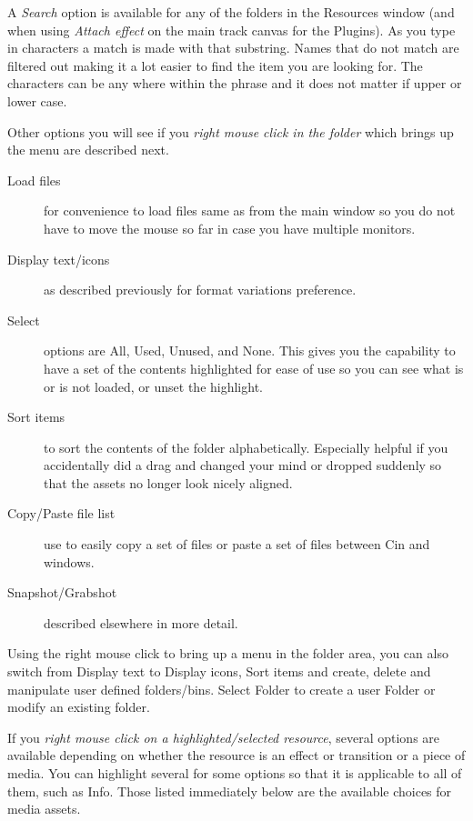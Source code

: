 A \emph{Search} option is available for any of the folders in the Resources window (and when using \textit{Attach effect} on the main track canvas for the Plugins).  
As you type in characters a match is made with that substring.  
Names that do not match are filtered out making it a lot easier to find the item you are looking for.  
The characters can be any where within the phrase and it does not matter if upper or lower case. 

Other options you will see if you \textit{right mouse click in the folder} which brings up the menu are described next.  

\begin{description}
    \item[ Load files ]  for convenience to load files same as from the main window so you do not have to move the mouse so far in case you have multiple monitors.
    \item[Display text/icons]  as described previously for format variations preference.
    \item[Select]  options are All, Used, Unused, and None.  This gives you the capability to have a set of the
        contents highlighted for ease of use so you can see what is or is not loaded, or unset the highlight.
    \item[Sort items]  to sort the contents of the folder alphabetically.  Especially helpful if you accidentally did a 
        drag and changed your mind or dropped suddenly so that the assets no longer look nicely aligned.
    \item[Copy/Paste file list]  use to easily copy a set of files or paste a set of files between Cin and windows.
    \item[Snapshot/Grabshot]  described elsewhere in more detail.
\end{description}

Using the right mouse click to bring up a menu in the folder area, you can also switch from Display text to Display icons, Sort items and create, delete and manipulate user defined folders/bins. Select Folder to create a user Folder or modify an existing folder.

If you \textit{right mouse click on a highlighted/selected resource}, several options are available depending on whether the resource is an effect or transition or a piece of media.  
You can highlight several for some options so that it is applicable to all of them, such as Info.  
Those listed immediately below are the available choices for media assets.


